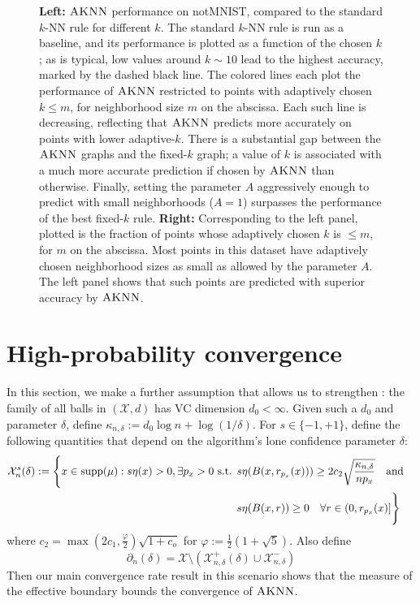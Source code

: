 \documentclass{article}
\def\X{{\mathcal X}}
\def\supp{{\rm supp}}
\newcommand{\algname}{\textsc{AKNN}}
\begin{document}
\begin{figure}
  \caption{\textbf{Left: } $\algname$ performance on notMNIST, compared to the standard $k$-NN rule for different $k$. The standard $k$-NN rule is run as a baseline, and its performance is plotted as a function of the chosen $k$; as is typical, low values around $k \sim 10$ lead to the highest accuracy, marked by the dashed black line. The colored lines each plot the performance of $\algname$ restricted to points with adaptively chosen $k \leq m$, for neighborhood size $m$ on the abscissa. Each such line is decreasing, reflecting that $\algname$ predicts more accurately on points with lower adaptive-$k$. There is a substantial gap between the $\algname$ graphs and the fixed-$k$ graph; a value of $k$ is associated with a much more accurate prediction if chosen by $\algname$ than otherwise. Finally, setting the parameter $A$ aggressively enough to predict with small neighborhoods ($A=1$) surpasses the performance of the best fixed-$k$ rule. \textbf{Right: } Corresponding to the left panel, plotted is the fraction of points whose adaptively chosen $k$ is $\leq m$, for $m$ on the abscissa. Most points in this dataset have adaptively chosen neighborhood sizes as small as allowed by the parameter $A$. The left panel shows that such points are predicted with superior accuracy by $\algname$.}
  \label{fig:aknnvsknn}
\end{figure}




















\appendix

\section{High-probability convergence}

In this section, we make a further assumption that allows us to strengthen : 
the family of all balls in $(\X, d)$ has VC dimension $d_0 < \infty$. 
Given such a $d_0$ and parameter $\delta$, define $\kappa_{n, \delta} := d_0 \log n + \log (1/\delta)$. 
For $s \in \{ -1, +1 \}$, define the following quantities that depend on the algorithm's lone confidence parameter $\delta$:
\begin{align*}
\X^{s}_n (\delta)
:= \Bigg\{
x \in \supp(\mu) : s \eta(x) > 0 , \exists p_x > 0 \text{ s.t. } 
&s \eta(B(x,r_{p_x}(x))) \geq 2 c_2 \sqrt{\frac{ \kappa_{n, \delta} }{n p_x}}
\quad\text{and}\quad \\
&s \eta(B(x,r)) \geq 0 \quad\forall r \in (0, r_{p_x}(x)]
\Bigg\}
\end{align*}
where $c_2 = \max(2c_1, \frac{\varphi}{2} ) \sqrt{1 + c_o}$ for $\varphi := \frac{1}{2} (1 + \sqrt{5})$.
Also define 
$$ \partial_n (\delta) = \X \setminus (\X^+_{n,\delta} (\delta) \cup \X^-_{n,\delta}) $$
Then our main convergence rate result in this scenario shows that the measure of the effective boundary bounds the convergence of $\algname$.
\end{document}
